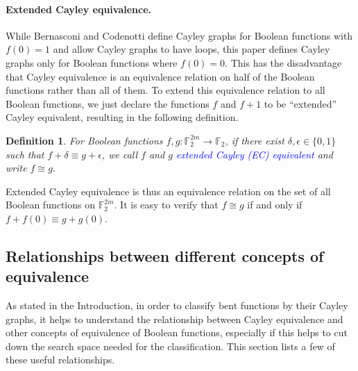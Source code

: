 \documentclass[12pt,a4paper]{article}
\newcommand{\mb}[1]{\mathbb{#1}}
\newcommand{\F}{\mb{F}}
\newcommand{\To}{\rightarrow}
\newcommand{\Emph}[1]{\emph{\textcolor{blue}{#1}}}
\newtheorem{Definition}{Definition}
\begin{document}
\paragraph*{Extended Cayley equivalence.}
%
While Bernasconi and Codenotti \cite{BerC99} define Cayley graphs for Boolean functions with
$f(0)=1$ and allow Cayley graphs to have loops, this paper defines Cayley
graphs only for Boolean functions where $f(0)=0$.
This has the disadvantage that Cayley equivalence is an equivalence relation on half
of the Boolean functions rather than all of them.
To extend this equivalence relation to all Boolean functions,
we just declare the functions $f$ and $f+1$ to be ``extended'' Cayley equivalent,
resulting in the following definition.
\begin{Definition}
For Boolean functions $f, g : \F_2^{2m} \To \F_2$,
if there exist $\delta, \epsilon \in \{0,1\}$ such that $f + \delta \equiv g + \epsilon$,
we call $f$ and $g$ \Emph{extended Cayley (EC) equivalent} and write $f \cong g$.
\end{Definition}
Extended Cayley equivalence is thus an equivalence relation on the set of all Boolean functions on
$\F_2^{2m}$.
It is easy to verify that $f \cong g$ if and only if $f+f(0) \equiv g+g(0)$.


\subsection{Relationships between different concepts of equivalence}

As stated in the Introduction, in order to classify bent functions by their Cayley graphs,
it helps to understand the relationship between Cayley equivalence and other concepts of equivalence
of Boolean functions, especially if this helps to cut down the search space needed for the classification.
This section lists a few of these useful relationships.

\end{document}
